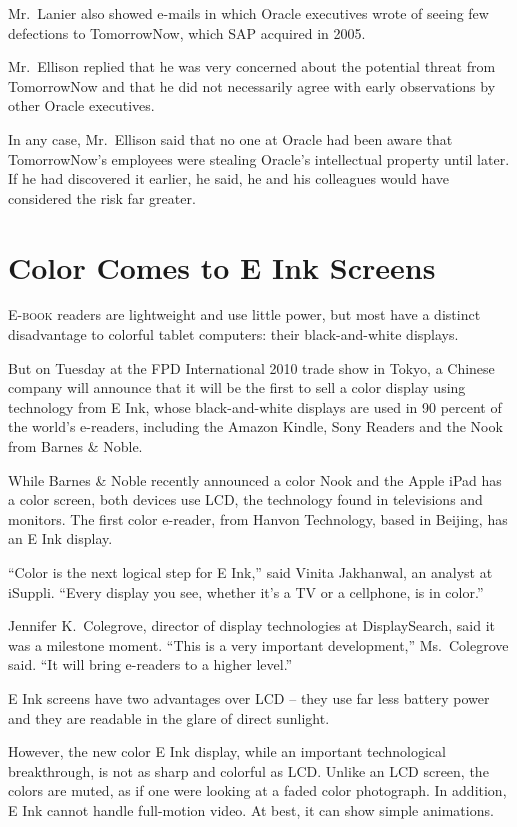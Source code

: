 ﻿\documentclass[12pt]{article}
\begin{document}
Mr.~Lanier also showed e-mails in which Oracle executives wrote of seeing few defections to
TomorrowNow, which SAP acquired in 2005.

Mr.~Ellison replied that he was very concerned about the potential threat from TomorrowNow and that
he did not necessarily agree with early observations by other Oracle executives.

In any case, Mr.~Ellison said that no one at Oracle had been aware that TomorrowNow's employees were
stealing Oracle's intellectual property until later. If he had discovered it earlier, he said, he
and his colleagues would have considered the risk far greater.

\section{Color Comes to E Ink Screens}

\lettrine{E}{-book} readers are lightweight and use little power, but most
have a distinct disadvantage to colorful tablet computers: their black-and-white displays.

But on Tuesday at the FPD International 2010 trade show in Tokyo, a Chinese company will announce
that it will be the first to sell a color display using technology from E Ink, whose black-and-white
displays are used in 90 percent of the world's e-readers, including the Amazon Kindle, Sony Readers
and the Nook from Barnes \& Noble.

While Barnes \& Noble recently announced a color Nook and the Apple iPad has a color screen, both
devices use LCD, the technology found in televisions and monitors. The first color e-reader, from
Hanvon Technology, based in Beijing, has an E Ink display.

``Color is the next logical step for E Ink,'' said Vinita Jakhanwal, an analyst at iSuppli. ``Every
display you see, whether it's a TV or a cellphone, is in color.''

Jennifer K.~Colegrove, director of display technologies at DisplaySearch, said it was a milestone
moment. ``This is a very important development,'' Ms.~Colegrove said. ``It will bring e-readers to a
higher level.''

E Ink screens have two advantages over LCD -- they use far less battery power and they are readable
in the glare of direct sunlight.

However, the new color E Ink display, while an important technological breakthrough, is not as sharp
and colorful as LCD. Unlike an LCD screen, the colors are muted, as if one were looking at a faded
color photograph. In addition, E Ink cannot handle full-motion video. At best, it can show simple
animations.
\end{document}
